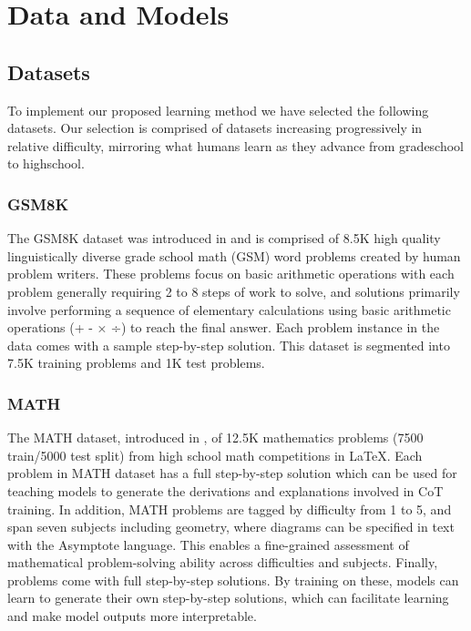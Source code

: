\section{Data and Models}

\subsection{Datasets}

To implement our proposed learning method we have selected the following datasets. Our selection is comprised of datasets increasing progressively in relative difficulty, mirroring what humans learn as they advance from gradeschool to highschool. 

\subsubsection{GSM8K}
    
    The GSM8K dataset was introduced in \citet{cobbe2021trainingverifierssolvemath} and is comprised of 8.5K high quality linguistically diverse grade school math (GSM) word problems created by human problem writers. These problems focus on basic arithmetic operations with each problem generally requiring 2 to 8 steps of work to solve, and solutions primarily involve performing a sequence of elementary calculations using basic arithmetic operations (+ - × ÷) to reach the final answer. Each problem instance in the data comes with a sample step-by-step solution. This dataset is segmented into 7.5K training problems and 1K test problems.

\subsubsection{MATH}
    
    The MATH dataset, introduced in \citet{hendrycks2021measuringmathematicalproblemsolving}, of 12.5K mathematics problems (7500 train/5000 test split) from high school math competitions in \LaTeX. Each problem in MATH dataset has a full step-by-step solution which can be used for teaching models to generate the derivations and explanations involved in CoT training. In addition, MATH problems are tagged by difficulty from 1 to 5, and span seven subjects including geometry, where diagrams can be specified in text with the Asymptote language. This enables a fine-grained assessment of mathematical problem-solving ability across difficulties and subjects. Finally, problems come with full step-by-step solutions. By training on these, models can learn to generate their own step-by-step solutions, which can facilitate learning and make model outputs more interpretable. 

